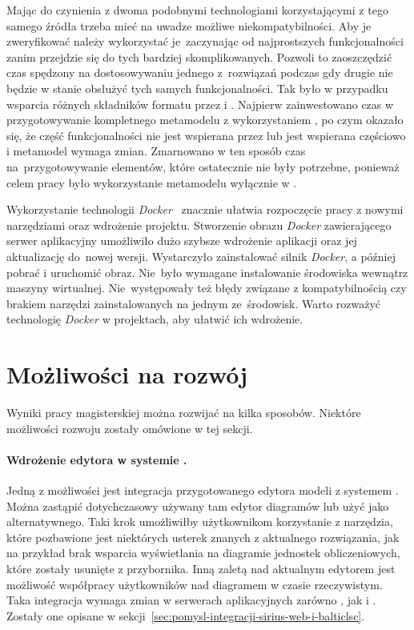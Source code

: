 Mając do czynienia z dwoma podobnymi technologiami korzystającymi z tego samego
źródła trzeba mieć na uwadze możliwe niekompatybilności. Aby je zweryfikować
należy wykorzystać je~zaczynając od najprostszych funkcjonalności zanim
przejdzie się do tych
bardziej skomplikowanych. Pozwoli to zaoszczędzić czas spędzony na
dostosowywaniu jednego z~rozwiązań podczas gdy drugie nie będzie w stanie
obsłużyć tych samych funkcjonalności. Tak było w przypadku wsparcia różnych
składników formatu \Ecore{} przez \SiriusDesktop{} i \SiriusWeb{}. Najpierw
zainwestowano czas w przygotowywanie kompletnego
metamodelu z
wykorzystaniem \SiriusDesktop{}, po czym okazało się, że część
funkcjonalności nie jest wspierana przez \SiriusWeb{} lub jest wspierana
częściowo i metamodel wymaga zmian. Zmarnowano w ten sposób czas
na~przygotowywanie elementów, które ostatecznie nie były potrzebne, ponieważ
celem
pracy było wykorzystanie metamodelu wyłącznie w \SiriusWeb{}.

Wykorzystanie technologii \emph{Docker}~\cite{wikipedia-docker} znacznie
ułatwia rozpoczęcie pracy z
nowymi narzędziami oraz wdrożenie projektu.
Stworzenie obrazu \emph{Docker} zawierającego serwer aplikacyjny \SiriusWeb{}
umożliwiło dużo szybsze wdrożenie aplikacji oraz jej aktualizację
do~nowej wersji. Wystarczyło zainstalować silnik \emph{Docker}, a później
pobrać i uruchomić obraz. Nie~było wymagane instalowanie środowiska \Java{}
wewnątrz maszyny wirtualnej. Nie~występowały też błędy związane z
kompatybilnością czy brakiem narzędzi zainstalowanych na jednym ze~środowisk.
Warto rozważyć technologię \emph{Docker} w projektach, aby ułatwić ich
wdrożenie.

\section{Możliwości na rozwój}

Wyniki pracy magisterskiej można rozwijać na kilka sposobów. Niektóre
możliwości rozwoju zostały omówione w tej sekcji.

\paragraph{Wdrożenie edytora w systemie \BalticLSC{}.}
Jedną z możliwości jest integracja przygotowanego edytora modeli z systemem
\BalticLSC{}. Można zastąpić dotychczasowy używany tam edytor diagramów lub
użyć \SiriusWeb{} jako alternatywnego. Taki krok umożliwiłby użytkownikom
\BalticLSC{} korzystanie z narzędzia, które pozbawione jest niektórych
usterek znanych z aktualnego rozwiązania, jak na przykład brak wsparcia
wyświetlania na diagramie jednostek obliczeniowych, które zostały usunięte z
przybornika.
Inną zaletą \SiriusWeb{} nad aktualnym edytorem jest możliwość współpracy
użytkowników nad diagramem w czasie rzeczywistym. Taka integracja wymaga zmian
w serwerach aplikacyjnych zarówno \SiriusWeb{}, jak i \BalticLSC{}.
Zostały one opisane w
sekcji~\ref{sec:pomysl-integracji-sirius-web-i-balticlsc}.

